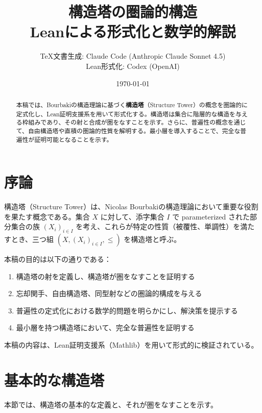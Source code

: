 \documentclass[a4paper,12pt]{ltjsarticle}
\title{構造塔の圏論的構造\\
\large Leanによる形式化と数学的解説}
\author{%
  TeX文書生成: Claude Code (Anthropic Claude Sonnet 4.5)\\
  Lean形式化: Codex (OpenAI)
}
\date{\today}
\theoremstyle{definition}
\begin{document}
\maketitle

\begin{abstract}
本稿では、Bourbakiの構造理論に基づく\textbf{構造塔}（Structure Tower）の概念を圏論的に定式化し、Lean証明支援系を用いて形式化する。構造塔は集合に階層的な構造を与える枠組みであり、その射と合成が圏をなすことを示す。さらに、普遍性の概念を通じて、自由構造塔や直積の圏論的性質を解明する。最小層を導入することで、完全な普遍性が証明可能となることを示す。
\end{abstract}

\tableofcontents
\newpage

\section{序論}

構造塔（Structure Tower）は、Nicolas Bourbakiの構造理論において重要な役割を果たす概念である。集合 $X$ に対して、添字集合 $I$ で parameterized された部分集合の族 $(X_i)_{i \in I}$ を考え、これらが特定の性質（被覆性、単調性）を満たすとき、三つ組 $(X, (X_i)_{i \in I}, \leq)$ を構造塔と呼ぶ。

本稿の目的は以下の通りである：
\begin{enumerate}
\item 構造塔の射を定義し、構造塔が圏をなすことを証明する
\item 忘却関手、自由構造塔、同型射などの圏論的構成を与える
\item 普遍性の定式化における数学的問題を明らかにし、解決策を提示する
\item 最小層を持つ構造塔において、完全な普遍性を証明する
\end{enumerate}

本稿の内容は、Lean証明支援系（Mathlib）を用いて形式的に検証されている。

\section{基本的な構造塔}
\label{sec:cat1}

本節では、構造塔の基本的な定義と、それが圏をなすことを示す。
\end{document}
